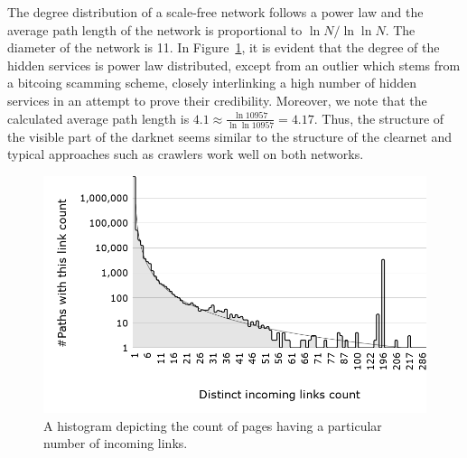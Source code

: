 The degree distribution of a scale-free network follows a power law and the average path length of the network is proportional to $\ln{N}/\ln{\ln{N}}$. The diameter of the  network is 11. In Figure~\ref{fig:powerLawAbnormality}, it is evident that the degree of the hidden services is power law distributed, except from an outlier which stems from a bitcoing scamming scheme, closely interlinking a high number of hidden services in an attempt to prove their credibility. Moreover, we note that the calculated average path length is $4.1 \approx \frac{\ln 10957}{\ln\ln 10957} = 4.17$. 
Thus, the structure of the visible part of the darknet seems similar to the structure of the clearnet and typical approaches such as crawlers work well on both networks.

\ifdgruyter
  \begin{figure}[H]
  \includegraphics[width=\linewidth]{images/DistinctIncomingLinksCount.png}
  \caption{A histogram depicting the count of pages having a particular
               number of incoming links.}
  \label{fig:powerLawAbnormality}
  \end{figure}
\fi

